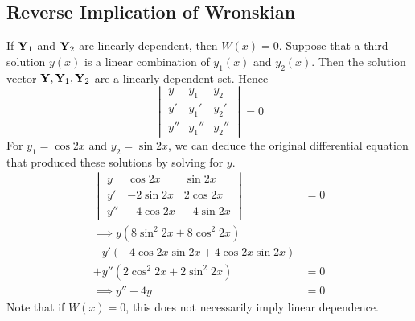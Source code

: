\subsection{Reverse Implication of Wronskian}
If $\vb Y_1$ and $\vb Y_2$ are linearly dependent, then $W(x) = 0$. Suppose that a third solution $y(x)$ is a linear combination of $y_1(x)$ and $y_2(x)$. Then the solution vector $\vb Y, \vb Y_1, \vb Y_2$ are a linearly dependent set. Hence
\[
	\begin{vmatrix}
		y   & y_1   & y_2   \\
		y'  & y_1'  & y_2'  \\
		y'' & y_1'' & y_2''
	\end{vmatrix}
	= 0
\]
For $y_1 = \cos 2x$ and $y_2 = \sin 2x$, we can deduce the original differential equation that produced these solutions by solving for $y$.
\begin{align*}
	\begin{vmatrix}
		y   & \cos 2x   & \sin 2x    \\
		y'  & -2\sin 2x & 2 \cos 2x  \\
		y'' & -4\cos 2x & -4 \sin 2x
	\end{vmatrix}          & = 0 \\
	\implies y(8\sin^2 2x + 8\cos^2 2x) &     \\ - y'(-4 \cos 2x \sin 2x + 4 \cos 2x \sin 2x) &\\ + y''(2\cos^2 2x + 2\sin^2 2x) &= 0 \\
	\implies y'' + 4y                   & = 0
\end{align*}
Note that if $W(x) = 0$, this does not necessarily imply linear dependence.

